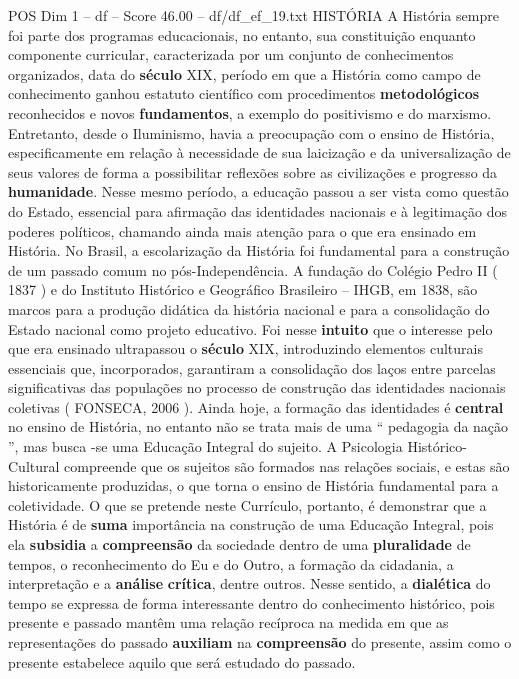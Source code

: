 \begin{textsample}{POS Dim 1 – df – Score 46.00 – df/df\_ef\_19.txt}  \label{ex:f1_pos_126}
HISTÓRIA A História sempre foi parte dos programas educacionais, no entanto, sua constituição enquanto componente curricular, caracterizada por um conjunto de conhecimentos organizados, data do \textbf{século} XIX, período em que a História como campo de conhecimento ganhou estatuto científico com procedimentos \textbf{metodológicos} reconhecidos e novos \textbf{fundamentos}, a exemplo do positivismo e do marxismo.
Entretanto, desde o Iluminismo, havia a preocupação com o ensino de História, especificamente em relação à necessidade de sua laicização e da universalização de seus valores de forma a possibilitar reflexões sobre as civilizações e progresso da \textbf{humanidade}.
Nesse mesmo período, a educação passou a ser vista como questão do Estado, essencial para afirmação das identidades nacionais e à legitimação dos poderes políticos, chamando ainda mais atenção para o que era ensinado em História.
No Brasil, a escolarização da História foi fundamental para a construção de um passado comum no pós-Independência.
A fundação do Colégio Pedro II ( 1837 ) e do Instituto Histórico e Geográfico Brasileiro – IHGB, em 1838, são marcos para a produção didática da história nacional e para a consolidação do Estado nacional como projeto educativo.
Foi nesse \textbf{intuito} que o interesse pelo que era ensinado ultrapassou o \textbf{século} XIX, introduzindo elementos culturais essenciais que, incorporados, garantiram a consolidação dos laços entre parcelas significativas das populações no processo de construção das identidades nacionais coletivas ( FONSECA, 2006 ).
Ainda hoje, a formação das identidades é \textbf{central} no ensino de História, no entanto não se trata mais de uma “ pedagogia da nação ”, mas busca -se uma Educação Integral do sujeito.
A Psicologia Histórico-Cultural compreende que os sujeitos são formados nas relações sociais, e estas são historicamente produzidas, o que torna o ensino de História fundamental para a coletividade.
O que se pretende neste Currículo, portanto, é demonstrar que a História é de \textbf{suma} importância na construção de uma Educação Integral, pois ela \textbf{subsidia} a \textbf{compreensão} da sociedade dentro de uma \textbf{pluralidade} de tempos, o reconhecimento do Eu e do Outro, a formação da cidadania, a interpretação e a \textbf{análise} \textbf{crítica}, dentre outros.
Nesse sentido, a \textbf{dialética} do tempo se expressa de forma interessante dentro do conhecimento histórico, pois presente e passado mantêm uma relação recíproca na medida em que as representações do passado \textbf{auxiliam} na \textbf{compreensão} do presente, assim como o presente estabelece aquilo que será estudado do passado.

\end{textsample}
